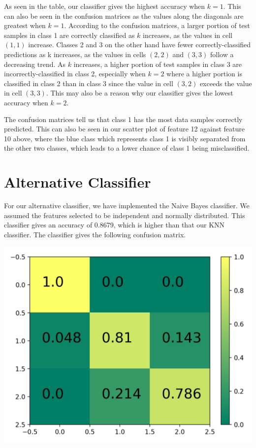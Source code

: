 \documentclass[11pt]{article}
\begin{document}
As seen in the table, our classifier gives the highest accuracy when $k = 1$. This can also be seen in the confusion matrices as the values along the diagonals are greatest when $k = 1$. According to the confusion matrices, a larger portion of test samples in class 1 are correctly classified as $k$ increases, as the values in cell $(1,1)$ increase. Classes 2 and 3 on the other hand have fewer correctly-classified predictions as k increases, as the values in cells $(2,2)$ and $(3,3)$ follow a decreasing trend. As $k$ increases, a higher portion of test samples in class 3 are incorrectly-classified in class 2, especially when $k = 2$ where a higher portion is classified in class 2 than in class 3 since the value in cell $(3,2)$ exceeds the value in cell $(3,3)$. This may also be a reason why our classifier gives the lowest accuracy when $k = 2$.

The confusion matrices tell us that class 1 has the most data samples correctly predicted. This can also be seen in our scatter plot of feature 12 against feature 10 above, where the blue class which represents class 1 is visibly separated from the other two classes, which leads to a lower chance of class 1 being misclassified.

\section{Alternative Classifier}
For our alternative classifier, we have implemented the Naive Bayes classifier. We assumed the features selected to be independent and normally distributed. This classifier gives an accuracy of 0.8679, which is higher than that our KNN classifier. The classifier gives the following confusion matrix.

\begin{center}
\includegraphics[scale=0.2]{naive_bayes_matrix}
\end{center}
\end{document}
